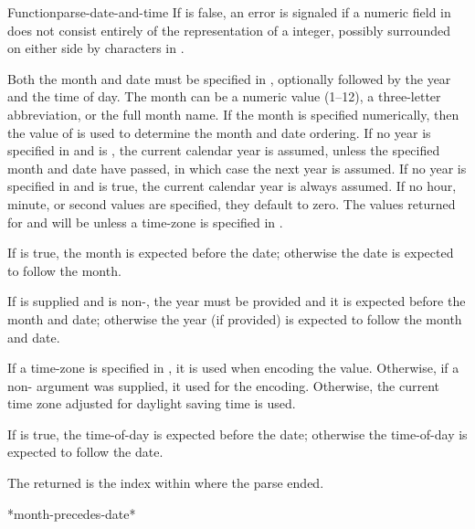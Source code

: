 \documentclass[10pt,twoside,english,pdftex]{article}
\begin{document}
\begin{functiondoc}{Function}{parse-date-and-time}
\fnerrors
%
If  is false, an error is signaled if a numeric field in
 does not consist entirely of the representation of a integer,
possibly surrounded on either side by characters in .

\fndescription
%
Both the month and date must be specified in , optionally followed
by the year and the time of day. The month can be a numeric value (1--12), a
three-letter abbreviation, or the full month name.  If the month is specified
numerically, then the value of  is used to
determine the month and date ordering.  If no year is specified in
 and  is \nil, the current
calendar year is assumed, unless the specified month and date have passed, in
which case the next year is assumed. If no year is specified in 
and  is true, the current calendar year
is always assumed. If no hour, minute, or second values are specified, they
default to zero.  The values returned for  and
 will be \nil{} unless a time-zone is specified
in .

\W{} 
%
If  is true, the month is expected before the date;
otherwise the date is expected to follow the month.

\W{} 
%
If  is supplied and is non-\nil, the year must be provided
and it is expected before the month and date; otherwise the year (if provided)
is expected to follow the month and date.

\W{} 
%
If a time-zone is specified in , it is used when encoding the
 value.  Otherwise, if a non-\nil{}
 argument was supplied, it used for the encoding.
Otherwise, the current time zone adjusted for daylight saving time is used.

\W{} 
%
If  is true, the time-of-day is expected before the date;
otherwise the time-of-day is expected to follow the date.

\W{} 
%
The returned  is the index within  where the
parse ended.

\begin{alsos}{*month-precedes-date*}
\end{alsos}


\end{functiondoc}
\end{document}
